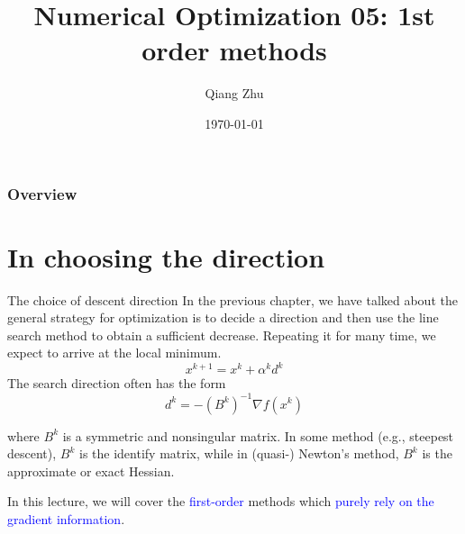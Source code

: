 \documentclass{beamer}
\title[Gradient Descent]{Numerical Optimization 05: 1st order methods} %
\author{Qiang Zhu} %
\institute[University of Nevada Las Vegas] %
{
University of Nevada Las Vegas\\ %
\medskip
}
\date{\today} %
\begin{document}
\begin{frame}
\titlepage %
\end{frame}

\begin{frame}
\frametitle{Overview} %
\tableofcontents %
\end{frame}



\section{In choosing the direction}
\begin{frame}{The choice of descent direction}
In the previous chapter, we have talked about the general strategy for optimization is to decide a direction and then use the line search method to obtain a sufficient decrease. Repeating it for many time, we expect to arrive at the local minimum.
\begin{equation*}
    x^{k+1} = x^k + \alpha^k d^k
\end{equation*} 
The search direction often has the form
\begin{equation}
		d^k = -(B^k)^{-1} \nabla f(x^k)
\end{equation}

where $B^k$ is a symmetric and nonsingular matrix. In some method (e.g., steepest descent), $B^k$ is the identify matrix, while in (quasi-) Newton's method, $B^k$ is the approximate or exact Hessian. 

In this lecture, we will cover the \textcolor{blue}{first-order} methods which \textcolor{blue}{purely rely on the gradient information}.

\end{frame}
\end{document}

